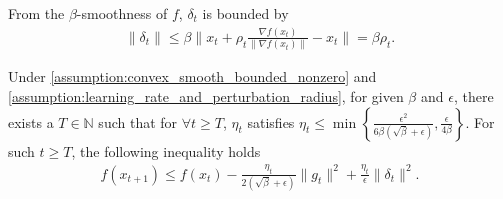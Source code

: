 \begin{remark}
    From the $\beta$-smoothness of $f$, $\delta_t$ is bounded by
    \begin{align}\label{remark:delta_bound}
        \|\delta_t\| \leq \beta \| x_t + \rho_t \frac{\nabla f(x_t)}{\|\nabla f(x_t)\|} - x_t \| = \beta \rho_t.
    \end{align}
\end{remark}

\begin{lemma}\label{lemma:descent_lemma}
    Under \cref{assumption:convex_smooth_bounded_nonzero} and \cref{assumption:learning_rate_and_perturbation_radius}, for given $\beta$ and $\epsilon$, there exists a $T \in \mathbb{N}$ such that for $\forall t \geq T$, $\eta_t$ satisfies $\eta_t \leq \min\left\{ \frac{\epsilon^2}{6\beta(\sqrt{\beta} + \epsilon)}, \frac{\epsilon}{4\beta} \right\}$.
    For such $t\geq T$, the following inequality holds
    \begin{align}
        f(x_{t+1}) \leq f(x_t) - \frac{\eta_t}{2(\sqrt{\beta} + \epsilon)} \|g_t\|^2 + \frac{\eta_t}{\epsilon} \|\delta_t\|^2.
    \end{align}
\end{lemma}

